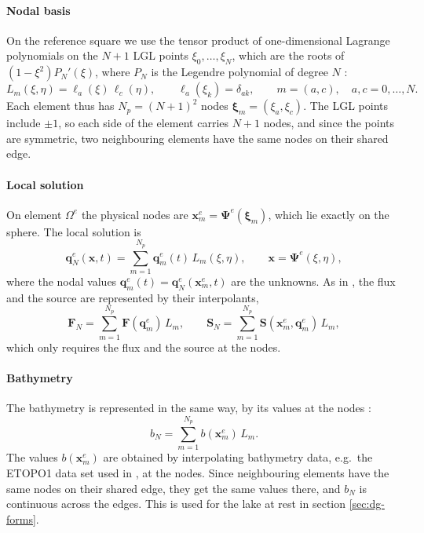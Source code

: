 \paragraph{Nodal basis}
On the reference square we use the tensor product of one-dimensional Lagrange polynomials on the $N+1$ LGL points $\xi_0,\dots,\xi_N$, which are the roots of $(1-\xi^2)P_N'(\xi)$, where $P_N$ is the Legendre polynomial of degree $N$ \cite{GIRALDO2002499}:
\begin{equation}
    L_m(\xi,\eta) = \ell_a(\xi)\,\ell_c(\eta), \qquad \ell_a(\xi_k) = \delta_{ak}, \qquad m = (a,c),\quad a,c = 0,\dots,N .
\end{equation}
Each element thus has $N_p = (N+1)^2$ nodes $\boldsymbol{\xi}_m = (\xi_a,\xi_c)$. The LGL points include $\pm1$, so each side of the element carries $N+1$ nodes, and since the points are symmetric, two neighbouring elements have the same nodes on their shared edge.

\paragraph{Local solution}
On element $\Omega^e$ the physical nodes are $\mathbf{x}^e_m = \boldsymbol{\Psi}^e(\boldsymbol{\xi}_m)$, which lie exactly on the sphere. The local solution is
\begin{equation}
    \mathbf{q}^e_N(\mathbf{x},t) = \sum_{m=1}^{N_p}\mathbf{q}^e_m(t)\,L_m(\xi,\eta), \qquad \mathbf{x} = \boldsymbol{\Psi}^e(\xi,\eta),
\end{equation}
where the nodal values $\mathbf{q}^e_m(t) = \mathbf{q}^e_N(\mathbf{x}^e_m,t)$ are the unknowns. As in \cite{GIRALDO2002499,bonev2018discontinuous}, the flux and the source are represented by their interpolants,
\begin{equation}\label{eq:dg-interp}
    \mathbf{F}_N = \sum_{m=1}^{N_p}\mathbf{F}(\mathbf{q}^e_m)\,L_m, \qquad \mathbf{S}_N = \sum_{m=1}^{N_p}\mathbf{S}(\mathbf{x}^e_m,\mathbf{q}^e_m)\,L_m,
\end{equation}
which only requires the flux and the source at the nodes.

\paragraph{Bathymetry}
The bathymetry is represented in the same way, by its values at the nodes \cite{bonev2018discontinuous}:
\begin{equation}\label{eq:dg-bathy}
    b_N = \sum_{m=1}^{N_p}b(\mathbf{x}^e_m)\,L_m .
\end{equation}
The values $b(\mathbf{x}^e_m)$ are obtained by interpolating bathymetry data, e.g.\ the ETOPO1 data set used in \cite{bonev2018discontinuous}, at the nodes. Since neighbouring elements have the same nodes on their shared edge, they get the same values there, and $b_N$ is continuous across the edges. This is used for the lake at rest in section \ref{sec:dg-forms}.

